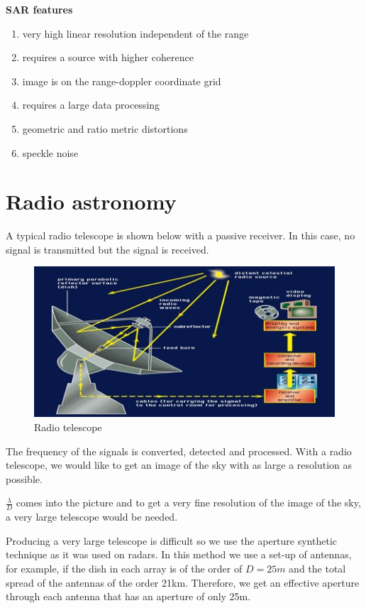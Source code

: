 \textbf{SAR features}
\begin{enumerate}
\itemsep0em
\item very high linear resolution independent of the range
\item requires a source with higher coherence
\item image is on the range-doppler coordinate grid
\item requires a large data processing
\item geometric and ratio metric distortions
\item speckle noise
\end{enumerate}

\section{Radio astronomy} 

A typical radio telescope is shown below with a passive receiver. In this case, no signal is transmitted but the signal is received.\\
\begin{figure}[h]
\centering
\includegraphics[scale=0.5]{./graphics/Radio-Telescope-0}
\caption{Radio telescope}
\end{figure}

The frequency of the signals is converted, detected and processed. With a radio telescope, we would like to get an image of the sky with as large a resolution as possible.

$\frac{\lambda}{D}$ comes into the picture and to get a very fine resolution of the image of the sky, a very large telescope would be needed.

Producing a very large telescope is difficult so we use the aperture synthetic technique as it was used on radars. In this method we use a set-up of antennas, for example, if the dish in each array is of the order of $ D = 25m $ and the total spread of the antennas of the order 21km. Therefore, we get an effective aperture through each antenna that has an aperture of only 25m.

